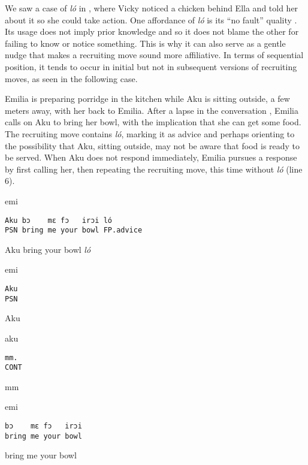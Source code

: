 \documentclass[output=paper]{langsci/langscibook}
\begin{document}
We saw a case of \textit{ló} in , where Vicky noticed a chicken behind Ella and told her about it so she could take action. One affordance of  \textit{ló} is its “no fault” quality \citep[271]{heritage_garfinkel_1984}. Its usage does not imply prior knowledge and so it does not blame the other for failing to know or notice something. This is why it can also serve as a gentle nudge that makes a recruiting move sound more affiliative. In terms of sequential position, it tends to occur in initial but not in subsequent versions of recruiting moves, as seen in the following case. 

Emilia is preparing porridge in the kitchen while Aku is sitting outside, a few meters away, with her back to Emilia. After a lapse in the conversation \citep[see][]{hoey_lapses:_2015}, Emilia calls on Aku to bring her bowl, with the implication that she can get some food. The recruiting move contains \textit{ló}, marking it as advice and perhaps orienting to the possibility that Aku, sitting outside, may not be aware that food is ready to be served. When Aku does not respond immediately, Emilia pursues a response by first calling her, then repeating the recruiting move, this time without \textit{ló} (line 6).

\vspace{2mm}
%
%
\begin{mdframednoverticalspace}[style=firstfoc]
\begin{transbox}{2}{emi}
\begin{verbatim}
Aku bɔ    mɛ fɔ   irɔi ló
PSN bring me your bowl FP.advice
\end{verbatim}
Aku bring your bowl \textit{ló}
\end{transbox}
\end{mdframednoverticalspace}
%
%
\begin{transbox}{4}{emi}
\begin{verbatim}
Aku
PSN
\end{verbatim}
Aku
\end{transbox}\vspace{1mm}
%
\begin{transbox}{5}{aku}
\begin{verbatim}
mm.
CONT
\end{verbatim}
mm
\end{transbox}\vspace{1mm}
%
\begin{mdframednoverticalspace}[style=firstfoc]
\begin{transbox}{6}{emi}
\begin{verbatim}
bɔ    mɛ fɔ   irɔi
bring me your bowl
\end{verbatim}
bring me your bowl
\end{transbox}
\end{mdframednoverticalspace}
%
\begin{mdframednoverticalspace}[style=secondfoc]
\end{mdframednoverticalspace}
\end{document}
